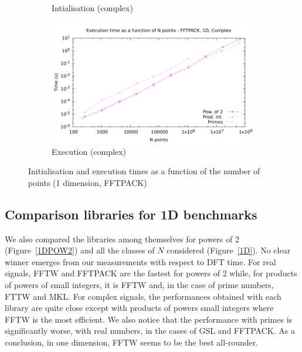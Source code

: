 \documentclass[12pt, a4paper]{article}
\begin{document}
\begin{figure}[H]
\begin{subfigure}{.5\textwidth}
\caption{Intialisation (complex)}
\label{1DFFTPACKCI}
\end{subfigure}%
\begin{subfigure}{.5\textwidth}
\centering
\includegraphics[width=.9\linewidth]{graphs/1d-fftpack-exec-c.pdf}
\caption{Execution (complex)}
\label{1DFFTPACKC}
\end{subfigure}
\caption{Initialisation and execution times as a function of the number of points (1 dimension, FFTPACK)}
\label{1DFFTPACK}
\end{figure}


\subsection{Comparison libraries for 1D benchmarks}
We also compared the libraries among themselves for powers of 2 (Figure~\ref{1DPOW2}) and all the 
classes of $N$ considered (Figure~\ref{1D}).  No clear winner emerges from our measurements with 
respect to DFT time. For 
real signals, FFTW and FFTPACK are the fastest for powers of 2 while, for products of powers of small 
integers, it is FFTW and, in the case of prime numbers, FTTW and MKL. For complex signals, the 
performances obtained with each library are quite close except with products of powers small integers 
where FFTW is the most efficient. We also notice that the performance with primes is significantly worse, 
with real numbers, in the cases of GSL and FFTPACK. As a conclusion, in one dimension, FFTW seems to be 
the best all-rounder.
\end{document}
